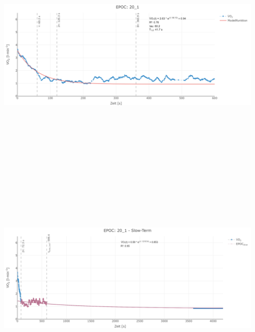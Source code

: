 \documentclass[
  letterpaper,
  DIV=11]{scrartcl}
\begin{document}
\includegraphics[width=11.45833in,height=4.6875in]{images/20_1_tau.png}
\includegraphics[width=11.45833in,height=4.6875in]{images/20_1_slow.png}
\end{document}
